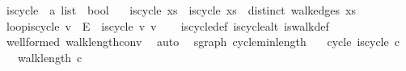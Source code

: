 \begin{isabellebody}
\isanewline
{}\isamarkupfalse%
\ is{\isacharunderscore}{\kern0pt}cycle{}\ {\isacharcolon}{\kern0pt}{\isacharcolon}{\kern0pt}\ {\isachardoublequoteopen}{\isacharprime}{\kern0pt}a\ list\ {\isasymRightarrow}\ bool{\isachardoublequoteclose}\ \isanewline
\ \ {\isachardoublequoteopen}is{\isacharunderscore}{\kern0pt}cycle{}\ xs\ {\isasymlongleftrightarrow}\ is{\isacharunderscore}{\kern0pt}cycle\ xs\ {\isasymand}\ distinct\ {\isacharparenleft}{\kern0pt}walk{\isacharunderscore}{\kern0pt}edges\ xs{\isacharparenright}{\kern0pt}{\isachardoublequoteclose}\isanewline
\isanewline
{}\isamarkupfalse%
\ loop{\isacharunderscore}{\kern0pt}is{\isacharunderscore}{\kern0pt}cycle{}{\isacharcolon}{\kern0pt}\ {\isachardoublequoteopen}{\isacharbraceleft}{\kern0pt}v{\isacharbraceright}{\kern0pt}\ {\isasymin}\ E\ {\isasymLongrightarrow}\ is{\isacharunderscore}{\kern0pt}cycle{}\ {\isacharbrackleft}{\kern0pt}v{\isacharcomma}{\kern0pt}\ v{\isacharbrackright}{\kern0pt}{\isachardoublequoteclose}\isanewline
%
\isadelimproof
\ \ %
\endisadelimproof
%
\isatagproof
{}\isamarkupfalse%
\ is{\isacharunderscore}{\kern0pt}cycle{}{\isacharunderscore}{\kern0pt}def\ is{\isacharunderscore}{\kern0pt}cycle{\isacharunderscore}{\kern0pt}alt\ is{\isacharunderscore}{\kern0pt}walk{\isacharunderscore}{\kern0pt}def\ \isamarkupfalse%
\ wellformed\ walk{\isacharunderscore}{\kern0pt}length{\isacharunderscore}{\kern0pt}conv\ \isamarkupfalse%
\ auto%
\endisatagproof
{\isafoldproof}%
%
\isadelimproof
\isanewline
%
\endisadelimproof
\isanewline
{}\isamarkupfalse%
\isanewline
\isanewline
{}\isamarkupfalse%
\ {\isacharparenleft}{\kern0pt}\ sgraph{\isacharparenright}{\kern0pt}\ cycle{}{\isacharunderscore}{\kern0pt}min{\isacharunderscore}{\kern0pt}length{\isacharcolon}{\kern0pt}\isanewline
\ \ \ cycle{\isacharcolon}{\kern0pt}\ {\isachardoublequoteopen}is{\isacharunderscore}{\kern0pt}cycle{}\ c{\isachardoublequoteclose}\isanewline
\ \ \ {\isachardoublequoteopen}walk{\isacharunderscore}{\kern0pt}length\ c\ {\isasymge}\ {}{\isachardoublequoteclose}\isanewline
%
\isadelimproof
%
\endisadelimproof
%
\isatagproof
{}\isamarkupfalse%
{\isacharminus}{\kern0pt}\isanewline
\ \ \isamarkupfalse%

\end{isabellebody}
